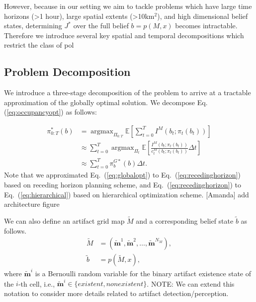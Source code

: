 \documentclass[letterpaper, 10 pt, conference]{ieeeconf}  %
\newcommand{\todo}[1]{{\color{red} #1 }} %
\newcommand{\note}[1]{{\color{cyan} NOTE: #1 }}
\newcommand{\argmax}{\mathop{\mathrm{argmax}}}
\begin{document}

However, because in our setting we aim to tackle problems which have large time horizons (>1 hour), large spatial extents (>10km$^2$), and high dimensional belief states, determining $J^*$ over the full belief $b=p(M,x)$ becomes intractable.  Therefore we introduce several key spatial and temporal decompositions which restrict the class of pol

\subsection{Problem Decomposition}

We introduce a three-stage decomposition of the problem to arrive at a tractable approximation of the globally optimal solution.  We decompose Eq. (\ref{eq:occupancyopt}) as follows:

\begin{align}
  \pi_{0:T}^*(b)
  & = \argmax_{\Pi_{0:T}} \mathbb{E} \left[ \sum_{t=0}^T I^M(b_t; \pi_t(b_t)) \right]
  \label{eq:globalopt}
  \\
  & \approx \sum_{t=0}^T \argmax_{\Pi_{t}} \mathbb{E} \left[ \frac{I^M(b_t; \pi_t(b_t))}{c_t^M(b_t; \pi_t(b_t))} \Delta t \right]
  \label{eq:recedinghorizon}
  \\
  & \approx \sum_{t=0}^T \pi_b^{G*}(b) \Delta t.
  \label{eq:hierarchical}
\end{align}
Note that we approximated Eq.~(\ref{eq:globalopt}) to Eq.~(\ref{eq:recedinghorizon}) based on receding horizon planning scheme, and Eq.~(\ref{eq:recedinghorizon}) to Eq.~(\ref{eq:hierarchical}) based on hierarchical optimization scheme. 
\todo{[Amanda] add architecture figure}



We can also define an artifact grid map $\tilde{M}$ and a corresponding belief state $\tilde{b}$ as follows.
\begin{align}
  \tilde{M} &= (\tilde{\mathbf{m}}^1, \tilde{\mathbf{m}}^2, \dots, \tilde{\mathbf{m}}^{N_M}), \\
  \tilde{b} &= p(\tilde{M}, x),
\end{align}
where $\tilde{\mathbf{m}}^i$ is a Bernoulli random variable for the binary artifact existence state of the $i$-th cell,
i.e., $\tilde{\mathbf{m}}^i \in \{existent, nonexistent\}$.
\note{We can extend this notation to consider more details related to artifact detection/perception.}
\end{document}
